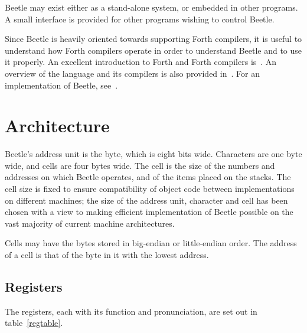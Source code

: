 \documentclass{article}
\newlength{\pronunc}\pronunc=1.7in
\begin{document}
Beetle may exist either as a stand-alone system, or embedded in other programs.
A small interface is provided for other programs wishing to control Beetle.

Since Beetle is heavily oriented towards supporting Forth compilers, it is
useful to understand how Forth compilers operate in order to understand Beetle
and to use it properly. An excellent introduction to Forth and Forth compilers
is~\cite{starting4th}. An overview of the language and its compilers is also
provided in~\cite{ANSIforth}. For an implementation of Beetle, see~\cite{cbeetle}.


\section{Architecture}

Beetle's address unit is the byte, which is eight bits wide. Characters are one
byte wide, and cells are four bytes wide. The cell is the size of the numbers
and addresses on which Beetle operates, and of the items placed on the stacks.
The cell size is fixed to ensure compatibility of object code between
implementations on different machines; the size of the address unit, character
and cell has been chosen with a view to making efficient implementation of
Beetle possible on the vast majority of current machine architectures.

Cells may have the bytes stored in big-endian or little-endian order. The
address of a cell is that of the byte in it with the lowest address.


\subsection{Registers}
\label{registers}

The registers, each with its function and pronunciation, are set out in table~\ref{regtable}.
\end{document}
